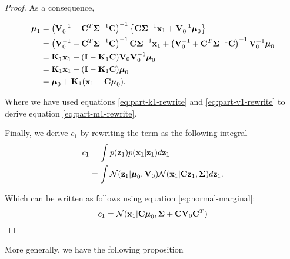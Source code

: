 \documentclass[11pt]{article}
\numberwithin{equation}{section}
\newcommand{\x}{{\bf x}}
\newcommand{\z}{{\bf z}}
\begin{document}
\begin{proof}
	As a consequence,

	\begin{align}
		\boldsymbol{\mu}_1 &= \left({\bf V}_0^{-1} + {\bf C}^T\boldsymbol{\Sigma}^{-1} {\bf C}\right)^{-1} \left\{{\bf C}\boldsymbol\Sigma^{-1}\x_1 + {\bf V}_0^{-1}\boldsymbol\mu_0\right\}\\
		&= \left({\bf V}_0^{-1} + {\bf C}^T\boldsymbol{\Sigma}^{-1} {\bf C}\right)^{-1} {\bf C}\boldsymbol\Sigma^{-1}\x_1 + \left({\bf V}_0^{-1} + {\bf C}^T\boldsymbol{\Sigma}^{-1} {\bf C}\right)^{-1} {\bf V}_0^{-1}\boldsymbol\mu_0\\
		&= {\bf K}_1\x_1 + ({\bf I} - {\bf K}_1{\bf C}){\bf V}_0 {\bf V}_0^{-1}\boldsymbol\mu_0 \label{eq:part-m1-rewrite}\\
		&= {\bf K}_1\x_1 + ({\bf I} - {\bf K}_1{\bf C})\boldsymbol\mu_0 \\
		&= \boldsymbol{\mu}_0 + {\bf K}_1(\x_1 -{\bf C}\boldsymbol\mu_0).
	\end{align}
	
	Where we have used equations \ref{eq:part-k1-rewrite} and \ref{eq:part-v1-rewrite} to derive equation \ref{eq:part-m1-rewrite}.
	
	Finally, we derive $c_1$ by rewriting the term as the following integral
	\begin{align}
		c_1 &= \int p(\z_1) p (\x_1 \vert \z_1) d\z_1\\
			&= \int \mathcal{N}(\z_1\vert \boldsymbol\mu_0, {\bf V}_0) \mathcal{N}(\x_1 \vert {\bf C}\z_1, \boldsymbol\Sigma) d\z_1.
	\end{align}
	
	Which can be written as follows using equation \ref{eq:normal-marginal}:
	\begin{equation}
		c_1 = \mathcal{N}(\x_1 \vert {\bf C}\boldsymbol\mu_0, \boldsymbol\Sigma + {\bf C}{\bf V}_0 {\bf C}^T)
	\end{equation}
\end{proof}


More generally, we have the following proposition
\end{document}

